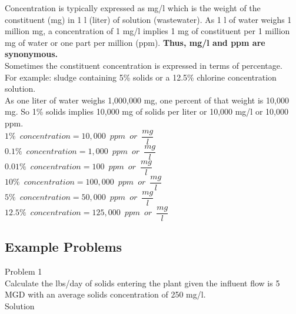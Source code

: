 Concentration is typically expressed as mg/l which is the weight of the constituent (mg) in 1 l (liter) of solution (wastewater).  As 1 l of water weighs 1 million mg, a concentration of 1 mg/l implies 1 mg of constituent per 1 million mg of water or one part per million (ppm).   \textbf{Thus, mg/l and ppm are synonymous.}\\  
Sometimes the constituent concentration is expressed in terms of percentage.\\
\vspace{6pt}
For example:  sludge containing 5\% solids or a 12.5\% chlorine concentration solution.\\
\vspace{6pt}
As one liter of water weighs 1,000,000 mg, one percent of that weight is 10,000 mg.  So 1\% solids implies 10,000 mg of solids per liter or 10,000 mg/l or 10,000 ppm.\\
\vspace{6pt}
$1\% \enspace concentration = 10,000 \enspace ppm \enspace or \enspace\dfrac{mg}{l}$\\
$0.1\% \enspace concentration = 1,000 \enspace ppm \enspace or \enspace \dfrac{mg}{l}$\\
$0.01\% \enspace concentration = 100 \enspace ppm \enspace or \enspace \dfrac{mg}{l}$\\
$10\% \enspace concentration = 100,000 \enspace ppm \enspace or \enspace \dfrac{mg}{l}$\\
$5\% \enspace concentration = 50,000 \enspace ppm \enspace or \enspace \dfrac{mg}{l}$\\
$12.5\% \enspace concentration = 125,000 \enspace ppm \enspace or \enspace \dfrac{mg}{l}$\\

\subsection{Example Problems}

Problem 1\\Calculate the lbs/day of solids entering the plant given the influent flow is 5 MGD with an average solids concentration  of 250 mg/l.\\

Solution\\

